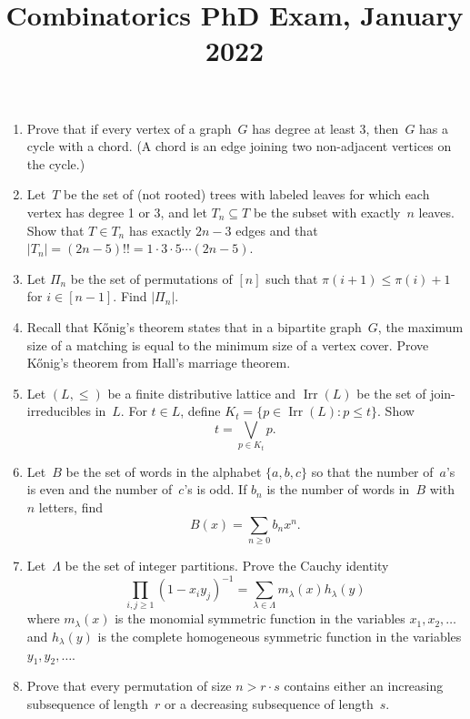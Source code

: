 \documentclass[11pt,letterpaper]{article}
\title{Combinatorics PhD Exam, January 2022}
\author{}
\date{}
\newenvironment{examproblems}[2]{%
  \def\ProblemHeadingTag{#2}%
  \AssignTaggingSocketPlug{block/list/label}{examproblem}%
  \begin{enumerate}%
  \setcounter{enumi}{#1}%
  \renewcommand{\labelenumi}{\textbf{\theenumi.}}%
  \setlength{\topsep}{0.35em}%
  \setlength{\partopsep}{0pt}%
  \setlength{\itemsep}{0.48em}%
  \setlength{\parsep}{0.18em}%
}{\end{enumerate}}
\begin{document}
\maketitle
\thispagestyle{empty}
\begin{examproblems}{0}{H2}
\def\ProblemHeadingText{Problem 1.}
\item
Prove that if every vertex of a graph~\(G\) has degree at least 3, then~\(G\) has a cycle with a chord. (A chord is an edge joining two non-adjacent vertices on the cycle.)
\def\ProblemHeadingText{Problem 2.}
\item
Let~\(T\) be the set of (not rooted) trees with labeled leaves for which each vertex has degree 1 or 3, and let \(T_n \subseteq T\) be the subset with exactly~\(n\) leaves. Show that \(T \in T_n\) has exactly \(2n-3\) edges and that \(|T_n|=(2n-5)!!=1\cdot 3\cdot 5\cdots(2n-5)\).
\def\ProblemHeadingText{Problem 3.}
\item
Let \(\Pi_n\) be the set of permutations of \([n]\) such that \(\pi(i+1)\leq \pi(i)+1\) for \(i\in[n-1]\). Find \(|\Pi_n|\).
\def\ProblemHeadingText{Problem 4.}
\item
Recall that Kőnig’s theorem states that in a bipartite graph~\(G\), the maximum size of a matching is equal to the minimum size of a vertex cover. Prove Kőnig’s theorem from Hall’s marriage theorem.
\def\ProblemHeadingText{Problem 5.}
\item
Let \((L,\leq)\) be a finite distributive lattice and \(\operatorname{Irr}(L)\) be the set of join-irreducibles in~\(L\). For \(t\in L\), define \(K_t=\{p\in\operatorname{Irr}(L):p\leq t\}\). Show
\[
t=\bigvee_{p\in K_t}p.
\]
\def\ProblemHeadingText{Problem 6.}
\item
Let~\(B\) be the set of words in the alphabet \(\{a,b,c\}\) so that the number of~\(a\)’s is even and the number of~\(c\)’s is odd. If \(b_n\) is the number of words in~\(B\) with~\(n\) letters, find
\[
B(x)=\sum_{n\geq 0}b_nx^n.
\]
\def\ProblemHeadingText{Problem 7.}
\item
Let~\(\Lambda\) be the set of integer partitions. Prove the Cauchy identity
\[
\prod_{i,j\geq 1}(1-x_i y_j)^{-1}=\sum_{\lambda\in\Lambda}m_\lambda(x)h_\lambda(y)
\]
 where \(m_\lambda(x)\) is the monomial symmetric function in the variables \(x_1,x_2,\ldots\) and \(h_\lambda(y)\) is the complete homogeneous symmetric function in the variables \(y_1,y_2,\ldots\).
\def\ProblemHeadingText{Problem 8.}
\item
Prove that every permutation of size \(n>r\cdot s\) contains either an increasing subsequence of length~\(r\) or a decreasing subsequence of length~\(s\).
\end{examproblems}
\end{document}
